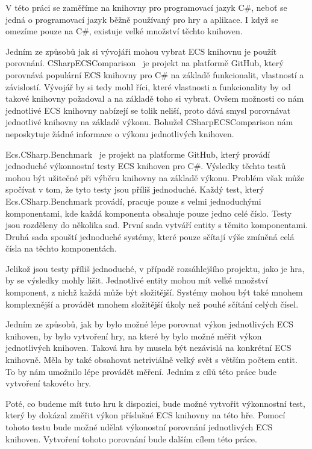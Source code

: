 V této práci se zaměříme na knihovny pro programovací jazyk C\#, neboť se jedná o programovací jazyk běžně používaný pro hry a aplikace. I když se omezíme pouze na C\#, existuje velké množství těchto knihoven.

Jedním ze způsobů jak si vývojáři mohou vybrat ECS knihovnu je použít porovnání. CSharpECSComparison~\cite{CSharpECSComparison} je projekt na platformě GitHub, který porovnává populární ECS knihovny pro C\# na základě funkcionalit, vlastností a závislostí. Vývojář by si tedy mohl říci, které vlastnosti a funkcionality by od takové knihovny požadoval a na základě toho si vybrat. Ovšem možnosti co nám jednotlivé ECS knihovny nabízejí se tolik neliší, proto dává smysl porovnávat jednotlivé knihovny na základě výkonu. Bohužel CSharpECSComparison nám neposkytuje žádné informace o výkonu jednotlivých knihoven.

Ecs.CSharp.Benchmark~\cite{EcsCsharpBenchmark} je projekt na platforme GitHub, který provádí jednoduché výkonnostní testy ECS knihoven pro C\#. Výsledky těchto testů mohou být užitečné při výběru knihovny na základě výkonu. Problém však může spočívat v tom, že tyto testy jsou příliš jednoduché. Každý test, který Ecs.CSharp.Benchmark provádí, pracuje pouze s velmi jednoduchými komponentami, kde každá komponenta obsahuje pouze jedno celé číslo. Testy jsou rozděleny do několika sad. První sada vytváří entity s těmito komponentami. Druhá sada spouští jednoduché systémy, které pouze sčítají výše zmíněná celá čísla na těchto komponentách.

Jelikož jsou testy příliš jednoduché, v případě rozsáhlejšího projektu, jako je hra, by se výsledky mohly lišit. Jednotlivé entity mohou mít velké množství komponent, z nichž každá může být složitější. Systémy mohou být také mnohem komplexnější a provádět mnohem složitější úkoly než pouhé sčítání celých čísel.

Jedním ze způsobů, jak by bylo možné lépe porovnat výkon jednotlivých ECS knihoven, by bylo vytvoření hry, na které by bylo možné měřit výkon jednotlivých knihoven. Taková hra by musela být nezávislá na konkrétní ECS knihovně. Měla by také obsahovat netriviálně velký svět s větším počtem entit. To by nám umožnilo lépe provádět měření. Jedním z cílů této práce bude vytvoření takovéto hry.

Poté, co budeme mít tuto hru k dispozici, bude možné vytvořit výkonnostní test, který by dokázal změřit výkon příslušné ECS knihovny na této hře. Pomocí tohoto testu bude možné udělat výkonostní porovnání jednotlivých ECS knihoven. Vytvoření tohoto porovnání bude dalším cílem této práce.

